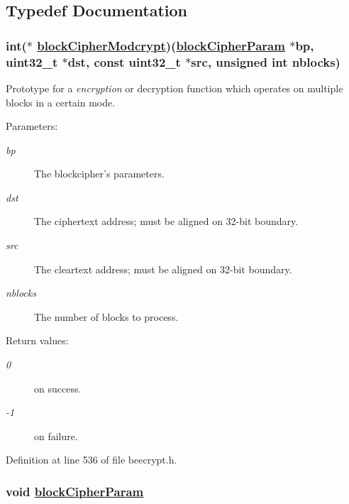\subsection{Typedef Documentation}
\hypertarget{group__BC__m_ga4}{
\subsubsection[blockCipherModcrypt]{\setlength{\rightskip}{0pt plus 5cm}int($\ast$ \hyperlink{group__BC__m_ga4}{block\-Cipher\-Modcrypt})(\hyperlink{group__BC__m_ga1}{block\-Cipher\-Param} $\ast$bp, uint32\_\-t $\ast$dst, const uint32\_\-t $\ast$src, unsigned int nblocks)}}
\label{group__BC__m_ga4}


Prototype for a {\em encryption\/} or decryption function which operates on multiple blocks in a certain mode. 

\begin{Desc}
\item[Parameters:]
\begin{description}
\item[{\em bp}]The blockcipher's parameters. \item[{\em dst}]The ciphertext address; must be aligned on 32-bit boundary. \item[{\em src}]The cleartext address; must be aligned on 32-bit boundary. \item[{\em nblocks}]The number of blocks to process. \end{description}
\end{Desc}
\begin{Desc}
\item[Return values:]
\begin{description}
\item[{\em 0}]on success. \item[{\em -1}]on failure. \end{description}
\end{Desc}
Definition at line 536 of file beecrypt.h.\hypertarget{group__BC__m_ga1}{
\subsubsection[blockCipherParam]{\setlength{\rightskip}{0pt plus 5cm}void \hyperlink{group__BC__m_ga1}{block\-Cipher\-Param}}}
\label{group__BC__m_ga1}


